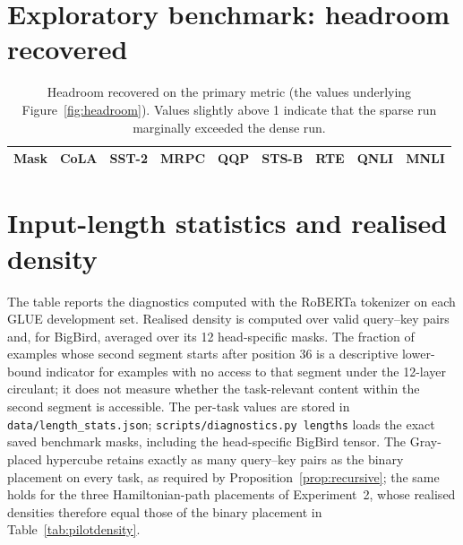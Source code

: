 \documentclass[10pt]{article}
\begin{document}
\section{Exploratory benchmark: headroom recovered}
\label{app:headroom}

\begin{table}[H]
\centering
\caption{Headroom recovered on the primary metric (the values underlying Figure~\ref{fig:headroom}). Values slightly above 1 indicate that the sparse run marginally exceeded the dense run.}
\small
\begin{tabular}{lcccccccc}
\toprule
Mask & CoLA & SST-2 & MRPC & QQP & STS-B & RTE & QNLI & MNLI \\
\midrule

\end{tabular}
\end{table}

\section{Input-length statistics and realised density}
\label{app:lengths}

The table reports the diagnostics computed with the RoBERTa tokenizer on each GLUE development set. Realised density is computed over valid query--key pairs and, for BigBird, averaged over its 12 head-specific masks. The fraction of examples whose second segment starts after position 36 is a descriptive lower-bound indicator for examples with no access to that segment under the 12-layer circulant; it does not measure whether the task-relevant content within the second segment is accessible. The per-task values are stored in \texttt{data/length\_stats.json}; \texttt{scripts/diagnostics.py lengths} loads the exact saved benchmark masks, including the head-specific BigBird tensor. The Gray-placed hypercube retains exactly as many query--key pairs as the binary placement on every task, as required by Proposition~\ref{prop:recursive}; the same holds for the three Hamiltonian-path placements of Experiment~2, whose realised densities therefore equal those of the binary placement in Table~\ref{tab:pilotdensity}.
\end{document}
